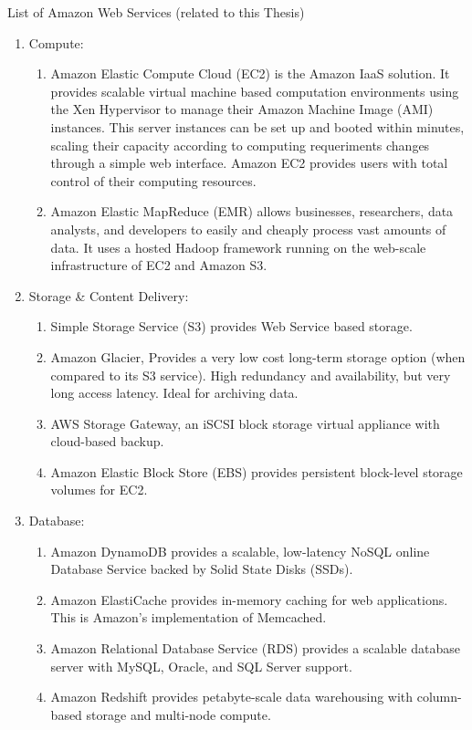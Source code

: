 \bigskip
List of Amazon Web Services (related to this Thesis) \cite{amazon:aws}
\begin{enumerate}
\item Compute:
\begin{enumerate}
   \item Amazon Elastic Compute Cloud (EC2) is the Amazon IaaS solution. It provides scalable virtual machine based computation environments using the Xen Hypervisor \cite{Xen} to manage their Amazon Machine Image (AMI) instances. This server instances can be set up and booted within minutes, scaling their capacity according to computing requeriments changes through a simple web interface. Amazon EC2 provides users with total control of their computing resources. 
   \item Amazon Elastic MapReduce (EMR) allows businesses, researchers, data analysts, and developers to easily and cheaply process vast amounts of data. It uses a hosted Hadoop framework running on the web-scale infrastructure of EC2 and Amazon S3.
\end{enumerate}
\item Storage  \& Content Delivery:
\begin{enumerate}
 \item Simple Storage Service (S3) provides Web Service based storage.
\item Amazon Glacier, Provides a very low cost long-term storage option (when compared to its S3 service). High redundancy and availability, but very long access latency. Ideal for archiving data.
\item AWS Storage Gateway, an iSCSI block storage virtual appliance with cloud-based backup.
\item Amazon Elastic Block Store (EBS) provides persistent block-level storage volumes for EC2.
\end{enumerate}
\item Database:
\begin{enumerate}
\item Amazon DynamoDB provides a scalable, low-latency NoSQL online Database Service backed by Solid State Disks (SSDs).
\item Amazon ElastiCache provides in-memory caching for web applications. This is Amazon's implementation of Memcached.
 \item Amazon Relational Database Service (RDS) provides a scalable database server with MySQL, Oracle, and SQL Server support.
 \item Amazon Redshift provides petabyte-scale data warehousing with column-based storage and multi-node compute.

\end{enumerate}
\end{enumerate}
